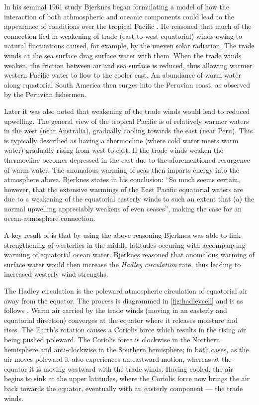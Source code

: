 \vspace{0.5cm}

In his seminal 1961 study Bjerknes began formulating a model of how the
interaction of both athmospheric and oceanic components could lead to the
appearance of \elnino{} conditions over the tropical Pacific
\citep{bjerknes1961}. He reasoned that much of the connection lied in weakening
of trade (east-to-west equatorial) winds owing to natural fluctuations caused,
for example, by the uneven solar radiation. The trade winds at the sea surface
drag surface water with them. When the trade winds weaken, the friction between
air and sea surface is reduced, thus allowing warmer western Pacific water to
flow to the cooler east. An abundance of warm water along equatorial South
America then surges into the Peruvian coast, as observed by the Peruvian
fishermen.

Later \citep{bjerknes1966} it was also noted that weakening of the trade winds
would lead to reduced upwelling. The general view of the tropical Pacific is of
relatively warmer waters in the west (near Australia), gradually cooling towards
the east (near Peru). This is typically described as having a thermocline (where
cold water meets warm water) gradually rising from west to east. If the trade
winds weaken the thermocline becomes depressed in the east due to the
aforementioned resurgence of warm water. The anomalous warming of seas then
imparts energy into the atmosphere above. Bjerknes states in his conclusion:
``So much seems certain, however, that the extensive warmings of the East
Pacific equatorial waters are due to a weakening of the equatorial easterly
winds to such an extent that (a) the normal upwelling appreciably weakens of
even ceases'', making the case for an ocean-atmosphere connection.

A key result of \citep{bjerknes1966} is that by using the above reasoning
Bjerknes was able to link strengthening of westerlies in the middle latitudes
occuring with accompanying warming of equatorial ocean water. Bjerknes reasoned
that anomalous warming of surface water would then increase the \emph{Hadley
  circulation} rate, thus leading to increased westerly wind strengths.

The Hadley circulation is the poleward atmospheric circulation of
equatorial air away from the equator. The process is diagrammed in
\ref{fig:hadleycell} and is as follows \citep{geomar6557}. Warm air carried by
the trade winds (moving in an easterly and equatorial direction) converges at
the equator where it releases moisture and rises. The Earth's rotation causes a
Coriolis force which results in the rising air being pushed poleward. The
Coriolis force is clockwise in the Northern hemisphere and anti-clockwise in the
Southern hemisphere; in both cases, as the air moves poleward it also
experiences an eastward motion, whereas at the equator it is moving westward
with the trade winds. Having cooled, the air begins to sink at the upper
latitudes, where the Coriolis force now brings the air back towards the equator,
eventually with an easterly component --- the trade winds.

